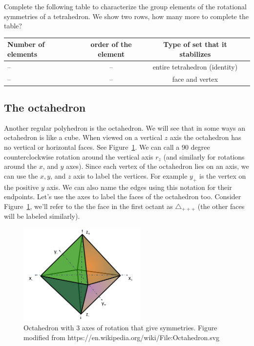 \begin{exercise}\label{exercise:actions:Tetra9}
Complete the following table to characterize the group elements of the rotational symmetries of a tetrahedron.  We show two rows, how many more to complete the table?
  
\begin{tabular}{| l |c|c| r |} \hline
  Number of elements & order of the element & Type of set that it stabilizes \\ \hline
  --&  --& entire tetrahedron (identity) \\ \hline
  -- & --& face and vertex \\  
\end{tabular}
\end{exercise}
\subsection{The octahedron}
Another regular polyhedron is the octahedron.  We will see that in some ways an octahedron is like a cube. 
When viewed on a vertical $z$ axis the octahedron has no vertical or horizontal faces.  See Figure~\ref{fig:OctaRot}.  We can call a 90 degree counterclockwise rotation around the vertical axis $r_z$ (and similarly for rotations around the $x$, and $y$ axes).
Since each vertex of the octahedron lies on an axis, we can use the $x,y$, and $z$ axis to label the vertices.  For example $y_+$ is the vertex on the positive $y$ axis.   We can also name the edges using this notation for their endpoints.   Let's use the axes to label the faces of the octahedron too.  Consider Figure~\ref{fig:OctaRot}, we'll refer to the the face in the first octant as $\triangle_{ +++}$ (the other faces will be labeled similarly).

\begin{figure}[ht]
\begin{center}
\includegraphics[width=2.5in]{images/AxesOfOctahedron.png}
\caption{Octahedron with 3 axes of rotation that give symmetries. Figure modified from https://en.wikipedia.org/wiki/File:Octahedron.svg
}\label{fig:OctaRot}
\end{center}
\end{figure}



